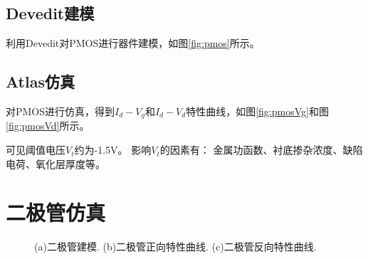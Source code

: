 \documentclass[12pt, a4paper, oneside]{ctexart}
\begin{document}
    \subsection{Devedit建模}
    利用Devedit对PMOS进行器件建模，如图\ref{fig:pmos}所示。

    \subsection{Atlas仿真}
    对PMOS进行仿真，得到$I_d-V_g$和$I_d-V_d$特性曲线，如图\ref{fig:pmosVg}和图\ref{fig:pmosVd}所示。

    可见阈值电压$V_t$约为-1.5V。 影响$V_t$的因素有：
    金属功函数、衬底掺杂浓度、缺陷电荷、氧化层厚度等。

    \section{二极管仿真}
    \begin{figure}[!h]
        \centering
        \hfil
        \newline
        \hfil
        \caption{(a)二极管建模. (b)二极管正向特性曲线. (c)二极管反向特性曲线.}
    \end{figure} 
\end{document}
